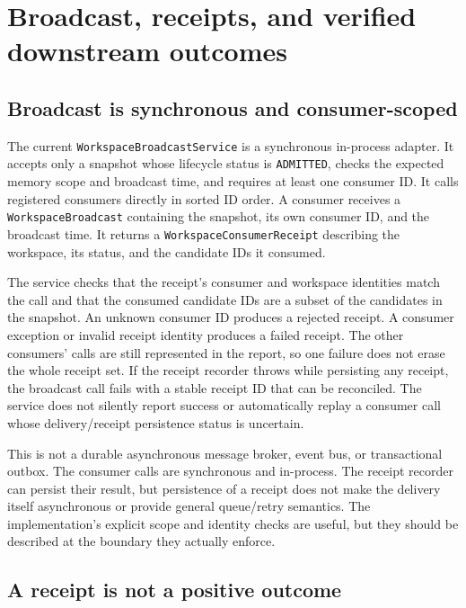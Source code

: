 \section{Broadcast, receipts, and verified downstream outcomes}
\label{sec:ch21-b3-broadcast}

\subsection{Broadcast is synchronous and consumer-scoped}
\label{subsec:ch21-b3-broadcast-semantics}

The current \texttt{Workspace\allowbreak{}Broadcast\allowbreak{}Service} is a synchronous in-process adapter. It accepts only a snapshot whose lifecycle status is \texttt{ADMITTED}, checks the expected memory scope and broadcast time, and requires at least one consumer ID. It calls registered consumers directly in sorted ID order. A consumer receives a \texttt{WorkspaceBroadcast} containing the snapshot, its own consumer ID, and the broadcast time. It returns a \texttt{Workspace\allowbreak{}Consumer\allowbreak{}Receipt} describing the workspace, its status, and the candidate IDs it consumed.

The service checks that the receipt's consumer and workspace identities match the call and that the consumed candidate IDs are a subset of the candidates in the snapshot. An unknown consumer ID produces a rejected receipt. A consumer exception or invalid receipt identity produces a failed receipt. The other consumers' calls are still represented in the report, so one failure does not erase the whole receipt set. If the receipt recorder throws while persisting any receipt, the broadcast call fails with a stable receipt ID that can be reconciled. The service does not silently report success or automatically replay a consumer call whose delivery/receipt persistence status is uncertain.

This is not a durable asynchronous message broker, event bus, or transactional outbox. The consumer calls are synchronous and in-process. The receipt recorder can persist their result, but persistence of a receipt does not make the delivery itself asynchronous or provide general queue/retry semantics. The implementation's explicit scope and identity checks are useful, but they should be described at the boundary they actually enforce.

\subsection{A receipt is not a positive outcome}
\label{subsec:ch21-b3-receipt-outcome}

